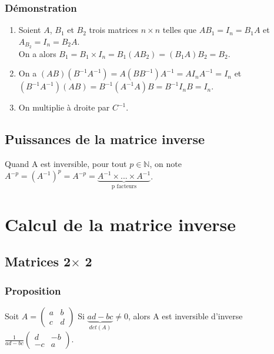 \documentclass[a4paper,10pt]{book} %
\newcommand{\N}{\mathbb{N}}
\begin{document}
\subsubsection{Démonstration}
\begin{enumerate} \item Soient $A$, $B_{1}$ et $B_{2}$ trois matrices $n\times n$ telles que $AB_{1}=I_{n}=B_{1}A$ et $A_{B_{2}}=I_{n}=B_{2}A$.\\
On a alors $B_{1}=B_{1}\times I_{n}=B_{1}(AB_{2})=(B_{1}A)B_{2}=B_{2}$.\\

\item On a $(AB)(B^{-1}A^{-1})=A(BB^{-1})A^{-1}=AI_{n}A^{-1}=I_{n}$ et\\
$(B^{-1}A^{-1})(AB)=B^{-1}(A^{-1}A)B=B^{-1}I_{n}B=I_{n}$.\\

\item On multiplie à droite par $C^{-1}$.

\end{enumerate}

\subsection{Puissances de la matrice inverse}
Quand A est inversible, pour tout $p\in \N$, on note $A^{-p}=(A^{-1})^{p}=A^{-p}=\underbrace{A^{-1}\times ...\times A^{-1}}_{\text{p facteurs}}$.

\newpage

\section{Calcul de la matrice inverse}
\subsection{Matrices 2$\times$ 2}
\subsubsection{Proposition}
Soit $A=\begin{pmatrix} a & b \\ c & d \end{pmatrix}$
Si $\underbrace{ad-bc}_{det(A)}\neq 0$, alors A est inversible d'inverse $\frac{1}{ad-bc}\begin{pmatrix} d & -b \\ -c & a \end{pmatrix}$.
\end{document}
